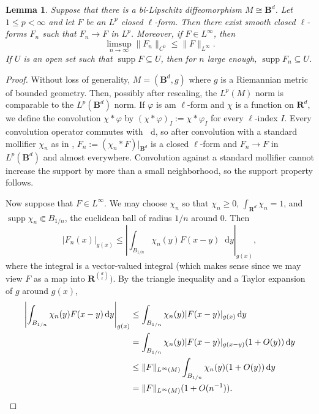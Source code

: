 \documentclass[reqno,11pt]{amsart}
\newcommand{\RR}{\mathbf{R}}
\newcommand{\Ball}{\mathbf{B}}
\newcommand*\dif{\mathop{}\!\mathrm{d}}
\DeclareMathOperator{\supp}{supp}
\newtheorem{lemma}[theorem]{Lemma}
\theoremstyle{definition}
\numberwithin{equation}{section}
\begin{document}
\begin{lemma}\label{mollification of closed forms}
Suppose that there is a bi-Lipschitz diffeomorphism $M \cong \Ball^d$.
Let $1 \leq p < \infty$ and let $F$ be an $L^p$ closed $\ell$-form.
Then there exist smooth closed $\ell$-forms $F_n$ such that $F_n \to F$ in $L^p$.
Moreover, if $F \in L^\infty$, then
\begin{equation}\label{heat kernel contracts sup norm}
\limsup_{n \to \infty} \|F_n\|_{C^0} \leq \|F\|_{L^\infty}.
\end{equation}
If $U$ is an open set such that $\supp F \subseteq U$, then for $n$ large enough, $\supp F_n \subseteq U$.
\end{lemma}
\begin{proof}
Without loss of generality, $M = (\Ball^d, g)$ where $g$ is a Riemannian metric of bounded geometry.
Then, possibly after rescaling, the $L^p(M)$ norm is comparable to the $L^p(\Ball^d)$ norm.
If $\varphi$ is am $\ell$-form and $\chi$ is a function on $\RR^d$, we define the convolution $\chi * \varphi$ by $(\chi * \varphi)_I := \chi * \varphi_I$ for every $\ell$-index $I$.
Every convolution operator commutes with $\dif$, so after convolution with a standard mollifier $\chi_n$ as in \cite[Appendix C, Theorem 6]{evans2010partial}, $F_n := (\chi_n * F)|_{\Ball^d}$ is a closed $\ell$-form and $F_n \to F$ in $L^p(\Ball^d)$ and almost everywhere.
Convolution against a standard mollifier cannot increase the support by more than a small neighborhood, so the support property follows.

Now suppose that $F \in L^\infty$.
We may choose $\chi_n$ so that $\chi_n \geq 0$, $\int_{\RR^d} \chi_n = 1$, and $\supp \chi_n \Subset B_{1/n}$, the euclidean ball of radius $1/n$ around $0$.
Then 
$$|F_n(x)|_{g(x)} \leq \left|\int_{B_{1/n}} \chi_n(y) F(x - y) \dif y\right|_{g(x)},$$
where the integral is a vector-valued integral (which makes sense since we may view $F$ as a map into $\RR^{\binom d\ell})$.
By the triangle inequality and a Taylor expansion of $g$ around $g(x)$,
\begin{align*}
\left|\int_{B_{1/n}} \chi_n(y) F(x - y) \dif y\right|_{g(x)}
&\leq \int_{B_{1/n}} \chi_n(y) |F(x - y)|_{g(x)} \dif y \\
&= \int_{B_{1/n}} \chi_n(y) |F(x - y)|_{g(x - y)}(1 + O(y)) \dif y \\
&\leq \|F\|_{L^\infty(M)} \int_{B_{1/n}} \chi_n(y)(1 + O(y)) \dif y \\
&= \|F\|_{L^\infty(M)}(1 + O(n^{-1})). \qedhere 
\end{align*}
\end{proof}


\printbibliography
\end{document}
